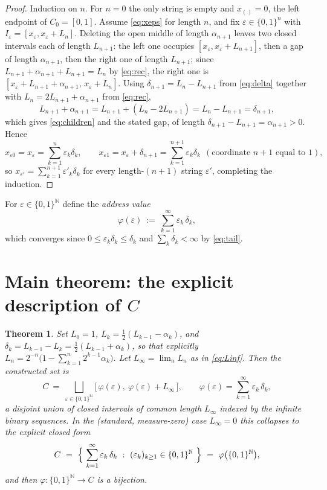 \documentclass{amsart}
\newtheorem{theorem}{Theorem}
\theoremstyle{definition}
\theoremstyle{remark}
\begin{document}
\begin{proof}
Induction on $n$. For $n=0$ the only string is empty and $x_{()}=0$, the left
endpoint of $C_0=[0,1]$. Assume \eqref{eq:xeps} for length $n$, and fix
$\varepsilon\in\{0,1\}^n$ with $I_\varepsilon=[x_\varepsilon,x_\varepsilon+L_{n}]$.
Deleting the open middle of length $\alpha_{n+1}$ leaves two closed intervals each
of length $L_{n+1}$: the left one occupies $[x_\varepsilon,x_\varepsilon+L_{n+1}]$,
then a gap of length $\alpha_{n+1}$, then the right one of length $L_{n+1}$; since
$L_{n+1}+\alpha_{n+1}+L_{n+1}=L_n$ by \eqref{eq:rec}, the right one is
$[x_\varepsilon+L_{n+1}+\alpha_{n+1},\,x_\varepsilon+L_n]$. Using
$\delta_{n+1}=L_n-L_{n+1}$ from \eqref{eq:delta} together with
$L_n=2L_{n+1}+\alpha_{n+1}$ from \eqref{eq:rec},
\[
L_{n+1}+\alpha_{n+1}=L_{n+1}+(L_n-2L_{n+1})=L_n-L_{n+1}=\delta_{n+1},
\]
which gives \eqref{eq:children} and the stated gap, of length
$\delta_{n+1}-L_{n+1}=\alpha_{n+1}>0$. Hence
\[
x_{\varepsilon0}=x_\varepsilon=\sum_{k=1}^{n}\varepsilon_k\delta_k,
\qquad
x_{\varepsilon1}=x_\varepsilon+\delta_{n+1}=\sum_{k=1}^{n+1}\varepsilon_k\delta_k
\ \ (\text{coordinate }n{+}1\text{ equal to }1),
\]
so $x_{\varepsilon'}=\sum_{k=1}^{n+1}\varepsilon'_k\delta_k$ for every length-$(n+1)$
string $\varepsilon'$, completing the induction.
\end{proof}

For $\varepsilon\in\{0,1\}^{\mathbb N}$ define the \emph{address value}
\begin{equation}\label{eq:phi}
\varphi(\varepsilon)\ :=\ \sum_{k=1}^{\infty}\varepsilon_k\,\delta_k ,
\end{equation}
which converges since $0\le\varepsilon_k\delta_k\le\delta_k$ and
$\sum_k\delta_k<\infty$ by \eqref{eq:tail}.

\section{Main theorem: the explicit description of $C$}

\begin{theorem}\label{thm:main}
Set $L_0=1$, $L_k=\tfrac12(L_{k-1}-\alpha_k)$, and
$\delta_k=L_{k-1}-L_k=\tfrac12(L_{k-1}+\alpha_k)$, so that explicitly
$L_n=2^{-n}\bigl(1-\sum_{k=1}^{n}2^{k-1}\alpha_k\bigr)$. Let $L_\infty=\lim_n L_n$
as in \eqref{eq:Linf}. Then the constructed set is
\begin{equation}\label{eq:general}
\boxed{\,C\ =\ \bigsqcup_{\varepsilon\in\{0,1\}^{\mathbb N}}
\bigl[\,\varphi(\varepsilon),\ \varphi(\varepsilon)+L_\infty\,\bigr],
\qquad
\varphi(\varepsilon)=\sum_{k=1}^{\infty}\varepsilon_k\,\delta_k,\,}
\end{equation}
a disjoint union of closed intervals of common length $L_\infty$ indexed by the
infinite binary sequences. In the (standard, measure-zero) case $L_\infty=0$ this
collapses to the explicit closed form
\begin{equation}\label{eq:main}
C\ =\ \Bigl\{\ \sum_{k=1}^{\infty}\varepsilon_k\,\delta_k\ :\
(\varepsilon_k)_{k\ge1}\in\{0,1\}^{\mathbb N}\ \Bigr\}
\ =\ \varphi\bigl(\{0,1\}^{\mathbb N}\bigr),
\end{equation}
and then $\varphi:\{0,1\}^{\mathbb N}\to C$ is a bijection.
\end{theorem}
\end{document}
